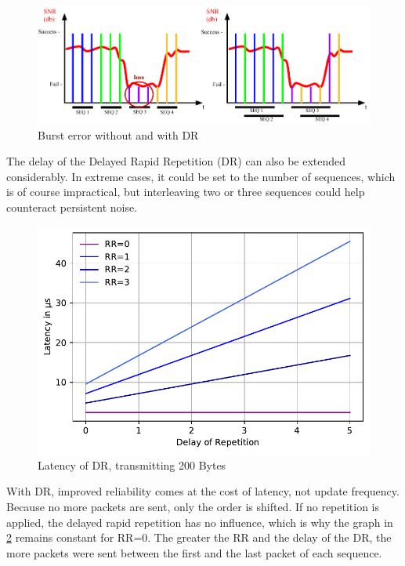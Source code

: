 \begin{figure}[h]
	\centering
	\includegraphics[scale=0.75]{figures/BadChannel.pdf}
	\caption{Burst error without and with DR}
	\label{fig:badChannel}
\end{figure}

The delay of the Delayed Rapid Repetition (DR) can also be extended considerably.
In extreme cases, it could be set to the number of sequences, which is of course impractical,
but interleaving two or three sequences could help counteract persistent noise.

\begin{figure}[h]
	\centering
	\includegraphics[scale=0.60]{../Plot2/Graphs/bc_dr.pdf}
	\caption{Latency of DR, transmitting 200 Bytes}
	\label{fig:dr_delay}
\end{figure}

With DR, improved reliability comes at the cost of latency, not update frequency.
Because no more packets are sent, only the order is shifted.
If no repetition is applied, the delayed rapid repetition has no influence,
which is why the graph in \cref{fig:dr_delay} remains constant for RR=0.
The greater the RR and the delay of the DR, the more packets were sent
between the first and the last packet of each sequence.

